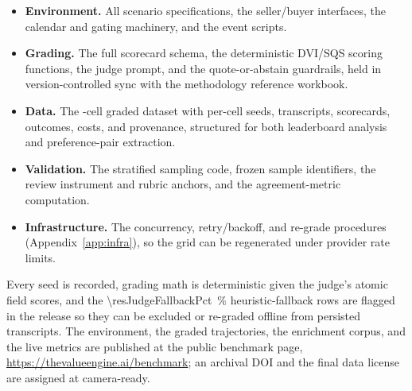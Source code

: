 \begin{itemize}[leftmargin=1.4em,itemsep=2pt,topsep=2pt]
  \item \textbf{Environment.} All \numScenarios{} scenario specifications, the
  seller/buyer interfaces, the calendar and gating machinery, and the event
  scripts.
  \item \textbf{Grading.} The full scorecard schema, the deterministic DVI/SQS
  scoring functions, the judge prompt, and the quote-or-abstain guardrails, held
  in version-controlled sync with the methodology reference workbook.
  \item \textbf{Data.} The \gridCellsTotal{}-cell graded dataset with per-cell
  seeds, transcripts, scorecards, outcomes, costs, and provenance, structured for
  both leaderboard analysis and preference-pair extraction.
  \item \textbf{Validation.} The stratified sampling code, frozen sample
  identifiers, the review instrument and rubric anchors, and the agreement-metric
  computation.
  \item \textbf{Infrastructure.} The concurrency, retry/backoff, and re-grade
  procedures (Appendix~\ref{app:infra}), so the grid can be regenerated under
  provider rate limits.
\end{itemize}

Every seed is recorded, grading math is deterministic given the judge's atomic
field scores, and the \SI{\resJudgeFallbackPct}{\percent} heuristic-fallback rows are flagged in the
release so they can be excluded or re-graded offline from persisted transcripts. The
environment, the \gridCellsTotal{} graded trajectories, the enrichment corpus, and
the live metrics are published at the public benchmark page,
\url{https://thevalueengine.ai/benchmark}; an archival DOI and the final data
license are assigned at camera-ready.
